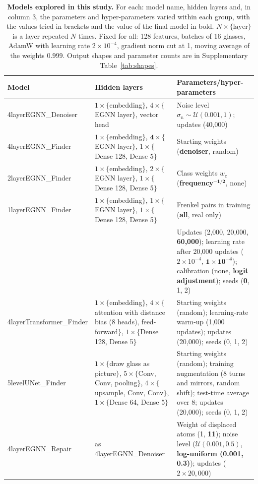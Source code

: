 \begin{table}[t]
\centering
\caption{\textbf{Models explored in this study.} For each: model name, hidden layers and, in column 3, the parameters and hyper-parameters varied within each group, with the values tried in brackets and the value of the final model in bold. $N\times\{\text{layer}\}$ is a layer repeated $N$ times. Fixed for all: 128 features, batches of 16 glasses, AdamW with learning rate $2\times10^{-4}$, gradient norm cut at 1, moving average of the weights 0.999. Output shapes and parameter counts are in Supplementary Table~\ref{tab:shapes}.}
\label{tab:models}
\footnotesize\setlength{\tabcolsep}{4pt}
\begin{tabularx}{\linewidth}{@{}l>{\raggedright\arraybackslash}X>{\raggedright\arraybackslash}p{2.05in}@{}}
\toprule
Model & Hidden layers & Parameters/hyper-parameters \\
\midrule
4layerEGNN\_Denoiser & $1\times\{$embedding$\}$, $4\times\{$EGNN layer$\}$, vector head & Noise level $\sigma_n\sim\mathcal U(0.001,1)$; updates (40,000) \\
\addlinespace
4layerEGNN\_Finder & $1\times\{$embedding$\}$, $\mathbf{4}\times\{$EGNN layer$\}$, $1\times\{$Dense 128, Dense 5$\}$ & Starting weights (\textbf{denoiser}, random) \\
2layerEGNN\_Finder & $1\times\{$embedding$\}$, $2\times\{$EGNN layer$\}$, $1\times\{$Dense 128, Dense 5$\}$ & Class weights $w_c$ (\textbf{frequency}$^{\mathbf{-1/2}}$, none) \\
1layerEGNN\_Finder & $1\times\{$embedding$\}$, $1\times\{$EGNN layer$\}$, $1\times\{$Dense 128, Dense 5$\}$ & Frenkel pairs in training (\textbf{all}, real only) \\
 & & Updates (2,000, 20,000, \textbf{60,000}); learning rate after 20,000 updates ($2\times10^{-4}$, $\mathbf{1\times10^{-4}}$); calibration (none, \textbf{logit adjustment}); seeds (\textbf{0}, 1, 2) \\
\addlinespace
4layerTransformer\_Finder & $1\times\{$embedding$\}$, $4\times\{$attention with distance bias (8 heads), feed-forward$\}$, $1\times\{$Dense 128, Dense 5$\}$ & Starting weights (random); learning-rate warm-up (1,000 updates); updates (20,000); seeds (0, 1, 2) \\
5levelUNet\_Finder & $1\times\{$draw glass as picture$\}$, $5\times\{$Conv, Conv, pooling$\}$, $4\times\{$upsample, Conv, Conv$\}$, $1\times\{$Dense 64, Dense 5$\}$ & Starting weights (random); training augmentation (8 turns and mirrors, random shift); test-time average over 8; updates (20,000); seeds (0, 1, 2) \\
\addlinespace
4layerEGNN\_Repair & as 4layerEGNN\_Denoiser & Weight of displaced atoms (1, \textbf{11}); noise level ($\mathcal U(0.001,0.5)$, \textbf{log-uniform (0.001, 0.3)}); updates ($2\times20{,}000$) \\
\bottomrule
\end{tabularx}
\end{table}
